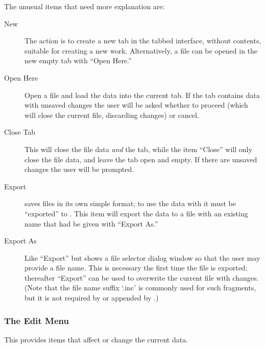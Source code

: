			The unusual items that need more explanation are:
			\begin{description}
			  \item[New] The action is to create a new tab in the
			  tabbed interface, without contents, suitable for
			  creating a new work. Alternatively, a file can be opened
			  in the new empty tab with ``Open Here.''
			  \item[Open Here] Open a file and load the data into
			  the current tab. If the tab contains data with
			  unsaved changes the user will be asked whether to
			  proceed (which will close the current file,
			  discarding changes) or cancel.
			  \item[Close Tab] This will close the file data
			  \emph{and} the tab, while the item ``Close''
			  will only close the file data, and leave the tab
			  open and empty. If there are unsaved changes the
			  user will be prompted.
			  \item[Export] \IXpkgu{} saves files in its own
			  simple format; to use the data with \IXpov{}
			  it must be ``exported'' to . This item
			  will export the data to a file with an existing
			  name that had be given with ``Export As.''
			  \item[Export As] Like ``Export'' but shows a file
			  selector dialog window so that the user may provide
			  a file name. This is necessary the first time the
			  file is exported; thereafter ``Export'' can be used
			  to overwrite the current file with changes. (Note that
			  the file name suffix `.inc' is commonly used for
			  such  fragments, but it is not required by
			  \IXpov{} or appended by \IXpkg.)
			\end{description}

			\subsubsection{The Edit Menu}%
			\label{sssec:edit_menu}
			This  provides items that
			affect or change the current data.

